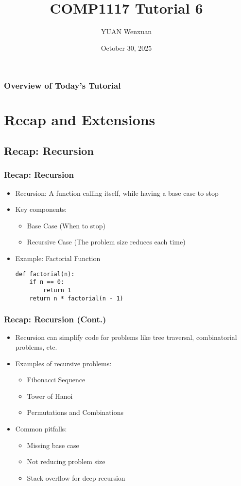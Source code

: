\documentclass{beamer}
\title{COMP1117 Tutorial 6}
\author{YUAN Wenxuan}
\date{October 30, 2025}
\begin{document}
\frame{\titlepage}

\begin{frame}
    \frametitle{Overview of Today's Tutorial}
    \tableofcontents
\end{frame}

\section{Recap and Extensions}
\subsection{Recap: Recursion}
\begin{frame}[fragile]
    \frametitle{Recap: Recursion}
    \begin{itemize}
        \item Recursion: A function calling itself, while having a base case to stop
        \item Key components:
              \begin{itemize}
                  \item Base Case (When to stop)
                  \item Recursive Case (The problem size reduces each time)
              \end{itemize}
        \item Example: Factorial Function
              \begin{verbatim}
def factorial(n):
    if n == 0:
        return 1
    return n * factorial(n - 1)
        \end{verbatim}
    \end{itemize}
\end{frame}
\begin{frame}
    \frametitle{Recap: Recursion (Cont.)}
    \begin{itemize}
        \item Recursion can simplify code for problems like tree traversal, combinatorial problems, etc.
        \item Examples of recursive problems:
              \begin{itemize}
                  \item Fibonacci Sequence
                  \item Tower of Hanoi
                  \item Permutations and Combinations
              \end{itemize}
        \item Common pitfalls:
              \begin{itemize}
                  \item Missing base case
                  \item Not reducing problem size
                  \item Stack overflow for deep recursion
              \end{itemize}
    \end{itemize}
\end{frame}
\end{document}

